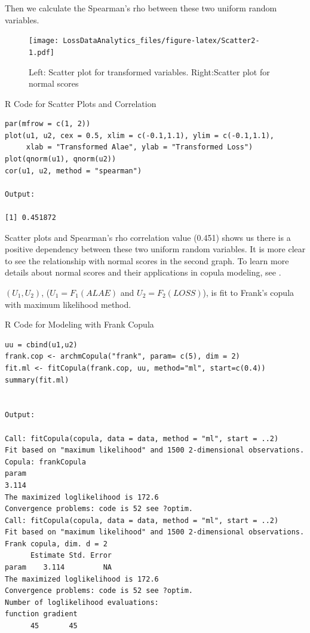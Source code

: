 \documentclass[]{book}
\theoremstyle{definition}
\theoremstyle{definition}
\theoremstyle{definition}
\theoremstyle{remark}
\begin{document}
Then we calculate the Spearman's rho between these two uniform random
variables.

\begin{figure}
\centering
\texttt{[image: LossDataAnalytics\_files/figure-latex/Scatter2-1.pdf]}
\caption{\label{fig:Scatter2}Left: Scatter plot for transformed variables.
Right:Scatter plot for normal scores}
\end{figure}

R Code for Scatter Plots and Correlation

\hypertarget{display.Cor.2}{}
\begin{verbatim}
par(mfrow = c(1, 2))
plot(u1, u2, cex = 0.5, xlim = c(-0.1,1.1), ylim = c(-0.1,1.1),
     xlab = "Transformed Alae", ylab = "Transformed Loss")
plot(qnorm(u1), qnorm(u2))
cor(u1, u2, method = "spearman")

Output: 

[1] 0.451872
\end{verbatim}

Scatter plots and Spearman's rho correlation value (0.451) shows us
there is a positive dependency between these two uniform random
variables. It is more clear to see the relationship with normal scores
in the second graph. To learn more details about normal scores and their
applications in copula modeling, see \citep{joe2014dependence}.

\((U_1, U_2)\), (\(U_1 = F_1(ALAE)\) and \(U_2=F_2(LOSS)\)), is fit to
Frank's copula with maximum likelihood method.

R Code for Modeling with Frank Copula

\hypertarget{display.FrankCopula.2}{}
\begin{verbatim}
uu = cbind(u1,u2) 
frank.cop <- archmCopula("frank", param= c(5), dim = 2)
fit.ml <- fitCopula(frank.cop, uu, method="ml", start=c(0.4))
summary(fit.ml)


Output: 

Call: fitCopula(copula, data = data, method = "ml", start = ..2)
Fit based on "maximum likelihood" and 1500 2-dimensional observations.
Copula: frankCopula 
param 
3.114 
The maximized loglikelihood is 172.6 
Convergence problems: code is 52 see ?optim.
Call: fitCopula(copula, data = data, method = "ml", start = ..2)
Fit based on "maximum likelihood" and 1500 2-dimensional observations.
Frank copula, dim. d = 2 
      Estimate Std. Error
param    3.114         NA
The maximized loglikelihood is 172.6 
Convergence problems: code is 52 see ?optim.
Number of loglikelihood evaluations:
function gradient 
      45       45 
\end{verbatim}
\end{document}
